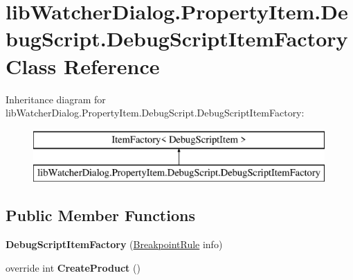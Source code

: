 \hypertarget{classlib_watcher_dialog_1_1_property_item_1_1_debug_script_1_1_debug_script_item_factory}{\section{lib\+Watcher\+Dialog.\+Property\+Item.\+Debug\+Script.\+Debug\+Script\+Item\+Factory Class Reference}
\label{classlib_watcher_dialog_1_1_property_item_1_1_debug_script_1_1_debug_script_item_factory}
}
Inheritance diagram for lib\+Watcher\+Dialog.\+Property\+Item.\+Debug\+Script.\+Debug\+Script\+Item\+Factory\+:\begin{figure}[H]
\begin{center}
\leavevmode
\includegraphics[height=2.000000cm]{classlib_watcher_dialog_1_1_property_item_1_1_debug_script_1_1_debug_script_item_factory}
\end{center}
\end{figure}
\subsection*{Public Member Functions}
\begin{DoxyCompactItemize}
\item 
\hypertarget{classlib_watcher_dialog_1_1_property_item_1_1_debug_script_1_1_debug_script_item_factory_ae529c61bf3f367ddb1bfe0a584a282ab}{{\bfseries Debug\+Script\+Item\+Factory} (\hyperlink{classlib_watcher_dialog_1_1_debug_script_engine_1_1_breakpoint_1_1_breakpoint_rule}{Breakpoint\+Rule} info)}\label{classlib_watcher_dialog_1_1_property_item_1_1_debug_script_1_1_debug_script_item_factory_ae529c61bf3f367ddb1bfe0a584a282ab}

\item 
\hypertarget{classlib_watcher_dialog_1_1_property_item_1_1_debug_script_1_1_debug_script_item_factory_af6a3e0f241f4dae53e221183025ea293}{override int {\bfseries Create\+Product} ()}\label{classlib_watcher_dialog_1_1_property_item_1_1_debug_script_1_1_debug_script_item_factory_af6a3e0f241f4dae53e221183025ea293}

\end{DoxyCompactItemize}
